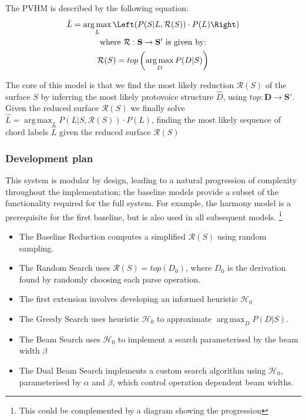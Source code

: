 \documentclass[12pt,a4paper,twoside,openright]{report}
\DeclareMathOperator*{\argmax}{arg\,max}
\theoremstyle{definition}
\begin{document}

The PVHM is described by the following equation: 
\begin{equation}
  \label{eq:pvhmSuccinct}
  \begin{gathered}
  \hat{L} = \argmax_L \Left( P(S|L, \mathcal{R}(S)) \cdot P(L) \Right)\\
  \text{where $\mathcal{R}: \mathbf{S} \to \mathbf{S'}$ is given by:} \\
  \mathcal{R} (S) = top \left(\argmax_D P(D|S) \right) \\
  \end{gathered}
\end{equation}

The core of this model is that we find the most likely reduction $\mathcal{R}(S)$ of the surface $S$ by inferring the most likely protovoice structure $\hat{D}$, using $top:\mathbf{D} \to \mathbf{S'}$. Given the reduced surface $\mathcal{R}(S)$ we finally solve $\hat{L} = \argmax_L P(L|S, \mathcal{R}(S)) \cdot P(L)$, finding the most likely sequence of chord labels $\hat{L}$ given the reduced surface $\mathcal{R}(S)$

\subsubsection{Development plan}
This system is modular by design, leading to a natural progression of complexity throughout the implementation; the baseline models provide a subset of the functionality required for the full system. For example, the harmony model is a prerequisite for the first baseline, but is also used in all subsequent models. \footnote{This could be complemented by a diagram showing the progression}

\begin{itemize}
  \item The Baseline Reduction computes a simplified $\mathcal{R}(S)$ using random sampling. 
  \item The Random Search uses $\mathcal{R}(S) = top (D_0)$, where $D_0$ is the derivation found by randomly choosing each parse operation. 
  \item The first extension involves developing an informed heuristic $\mathcal{H}_0$
  \item The Greedy Search uses heuristic $\mathcal{H}_0$ to approximate $\argmax_D P(D|S)$.
  \item The Beam Search uses $\mathcal{H}_0$ to implement a search parameterised by the beam width $\beta$
  \item The Dual Beam Search implements a custom search algorithm using $\mathcal{H}_0$, parameterised by $\alpha$ and $\beta$, which control operation dependent beam widths.  
\end{itemize}
\end{document}
